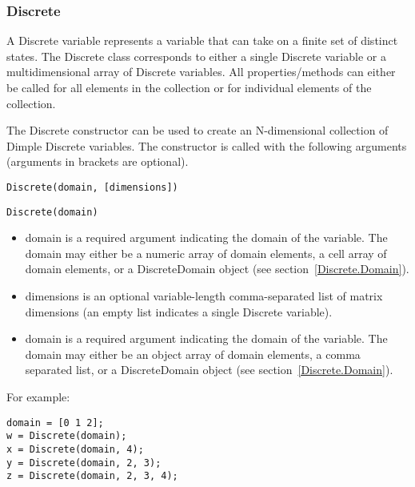\fi

\subsubsection{Discrete}
\label{sec:Discrete}

A Discrete variable represents a variable that can take on a finite set of distinct states.  The Discrete class corresponds to either a single Discrete variable or a multidimensional array of Discrete variables.  All properties/methods can either be called for all elements in the collection or for individual elements of the collection.


The Discrete constructor can be used to create an N-dimensional collection of Dimple Discrete variables.  The constructor is called with the following arguments (arguments in brackets are optional).

\ifmatlab
\begin{lstlisting}
Discrete(domain, [dimensions])
\end{lstlisting}
\fi

\ifjava
\begin{lstlisting}
Discrete(domain)
\end{lstlisting}
\fi

\ifmatlab
\begin{itemize}
\item domain is a required argument indicating the domain of the variable.  The domain may either be a numeric array of domain elements, a cell array of domain elements, or a DiscreteDomain object (see section~\ref{Discrete.Domain}).
\item dimensions is an optional variable-length comma-separated list of matrix dimensions (an empty list indicates a single Discrete variable).
\end{itemize}
\fi

\ifjava
\begin{itemize}
\item domain is a required argument indicating the domain of the variable.  The domain may either be an object array of domain elements, a comma separated list, or a DiscreteDomain object (see section~\ref{Discrete.Domain}).
\end{itemize}
\fi

For example:

\ifmatlab
\begin{lstlisting}
domain = [0 1 2];
w = Discrete(domain);
x = Discrete(domain, 4);
y = Discrete(domain, 2, 3);
z = Discrete(domain, 2, 3, 4);
\end{lstlisting}
\fi

